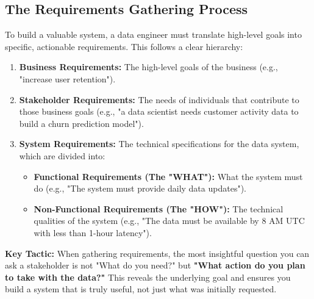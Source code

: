 \documentclass{article}
\begin{document}
\subsection{The Requirements Gathering Process}
To build a valuable system, a data engineer must translate high-level goals into specific, actionable requirements. This follows a clear hierarchy:
\begin{enumerate}
    \item \textbf{Business Requirements:} The high-level goals of the business (e.g., "increase user retention").
    \item \textbf{Stakeholder Requirements:} The needs of individuals that contribute to those business goals (e.g., "a data scientist needs customer activity data to build a churn prediction model").
    \item \textbf{System Requirements:} The technical specifications for the data system, which are divided into:
    \begin{itemize}
        \item \textbf{Functional Requirements (The "WHAT"):} What the system must do (e.g., "The system must provide daily data updates").
        \item \textbf{Non-Functional Requirements (The "HOW"):} The technical qualities of the system (e.g., "The data must be available by 8 AM UTC with less than 1-hour latency").
    \end{itemize}
\end{enumerate}

\textbf{Key Tactic:} When gathering requirements, the most insightful question you can ask a stakeholder is not "What do you need?" but \textbf{"What action do you plan to take with the data?"} This reveals the underlying goal and ensures you build a system that is truly useful, not just what was initially requested.
\end{document}

